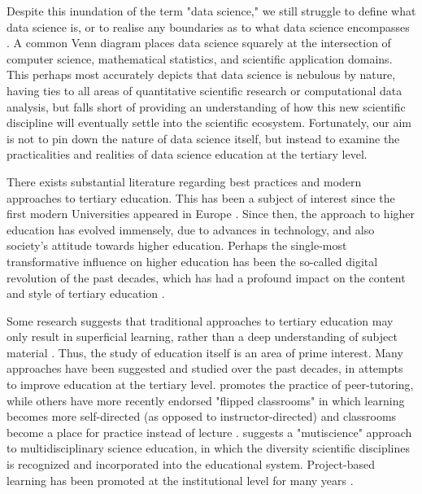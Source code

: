 \documentclass{sig-alternate}
\begin{document}
Despite this inundation of the term "data science," we still struggle to define what data science is, or to realise any boundaries as to what data science encompasses \cite{Hayashi1998, Loukides2011, Provost2013}. A common Venn diagram places data science squarely at the intersection of computer science, mathematical statistics, and scientific application domains.  This perhaps most accurately depicts that data science is nebulous by nature, having ties to all areas of quantitative scientific research or computational data analysis, but falls short of providing an understanding of how this new scientific discipline will eventually settle into the scientific ecosystem.  Fortunately, our aim is not to pin down the nature of data science itself, but instead to examine the practicalities and realities of data science education at the tertiary level.

There exists substantial literature regarding best practices and modern approaches to tertiary education. This has been a subject of interest since the first modern Universities appeared in Europe \cite{Rudy1984, Pedersen1997}.  Since then, the approach to higher education has evolved immensely, due to advances in technology, and also society's attitude towards higher education.  Perhaps the single-most transformative influence on higher education has been the so-called digital revolution of the past decades, which has had a profound impact on the content and style of tertiary education \cite{Roberts1994, Ely1995, Baker1997, Wood2005, Baek2008}.

Some research suggests that traditional approaches to tertiary education may only result in superficial learning, rather than a deep understanding of subject material \cite{Entwistle1992}.  Thus, the study of education itself is an area of prime interest.  Many approaches have been suggested and studied over the past decades, in attempts to improve education at the tertiary level.  \cite{Topping1996} promotes the practice of peer-tutoring, while others have more recently endorsed "flipped classrooms" in which learning becomes more self-directed (as opposed to instructor-directed) and classrooms become a place for practice instead of lecture \cite{Horn2013, Herreid2013}.  \cite{Ogawa1995} suggests a "mutiscience" approach to multidisciplinary science education, in which the diversity scientific disciplines is recognized and incorporated into the educational system.  Project-based learning has been promoted at the institutional level for many years \cite{Krajcik2006, Thomas2000}.
\end{document}

